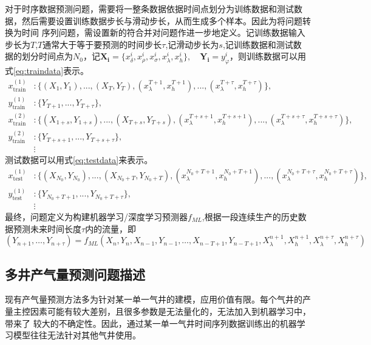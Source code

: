 对于时序数据预测问题，需要将一整条数据依据时间点划分为训练数据和测试数据，然后需要设置训练数据步长与滑动步长，从而生成多个样本。因此为将问题转换为时间
序列问题，需设置新的符合并对问题作进一步地定义。记训练数据输入步长为$T$,$T$通常大于等于要预测的时间步长$\tau$,记滑动步长为$s$,记训练数据和测试数
据的划分时间点为$N_0$，记$\mathbf{X_i} = \{x^i_\delta, x^i_\rho, x^i_\sigma, x^i_\lambda, x^i_h\}, \quad \mathbf{Y_i} = y^i_\varphi$，则训练数据可以用式\eqref{eq:traindata}表示。
\begin{equation}
    \begin{aligned}
    x_{\text{train}}^{(1)} &: \{ (X_1, Y_1), ..., (X_{T}, Y_{T}), (x^{T+1}_{\lambda }, x^{T+1}_{h }), ..., (x^{T+\tau}_{\lambda }, x^{T+\tau}_{h}) \}, \\
    y_{\text{train}}^{(1)} &: \{Y_{T+1}, ... ,Y_{T+\tau}\}, \\
    x_{\text{train}}^{(2)} &: \{ (X_{1+s}, Y_{1+s}), ..., (X_{T+s}, Y_{T+s}), (x^{T+s+1}_\lambda , x^{T+s+1}_h ), ..., (x^{T+s+\tau}_{\lambda }, x^{T+s+\tau}_{h}) \}, \\
    y_{\text{train}}^{(2)} &: \{Y_{T+s+1}, ... ,Y_{T+s+\tau}\}, \\
    & \vdots
    \end{aligned}
    \label{eq:traindata}
\end{equation}
测试数据可以用式\eqref{eq:testdata}来表示。
\begin{equation}
    \begin{aligned}
    x_{\text{test}}^{(1)} &: \{ (X_{N_0}, Y_{N_0}), ..., (X_{N_0 + T}, Y_{N_0 + T}), (x^{N_0 + T+1}_{\lambda }, x^{N_0 + T+1}_{h }), ..., (x^{N_0 + T+\tau}_{\lambda }, x^{N_0 + T+\tau}_{h}) \}, \\
    y_{\text{test}}^{(1)} &: \{Y_{N_0 + T+1}, ... ,Y_{N_0 + T+\tau}\}, \\
    & \vdots
    \end{aligned}
    \label{eq:testdata}
\end{equation}
最终，问题定义为构建机器学习/深度学习预测器$f_{ML }$,根据一段连续生产的历史数据预测未来时间长度$\tau$内的流量，即
\begin{equation}
    (Y_{n+1}, \ldots, Y_{n+\tau}) = f_{ML}(X_n, Y_n, X_{n-1}, Y_{n-1}, \ldots, X_{n-T+1}, Y_{n-T+1}, X^{n+1}_{\lambda}, X^{n+1}_{h}, X^{n+\tau}_{\lambda}, X^{n+\tau}_{h})
\end{equation}
    
\subsection{多井产气量预测问题描述}
现有产气量预测方法多为针对某一单一气井的建模，应用价值有限。每个气井的产量主控因素可能有较大差别，且很多参数是无法量化的，无法加入到机器学习中，带来了
较大的不确定性。因此，通过某一单一气井时间序列数据训练出的机器学习模型往往无法针对其他气井使用。

